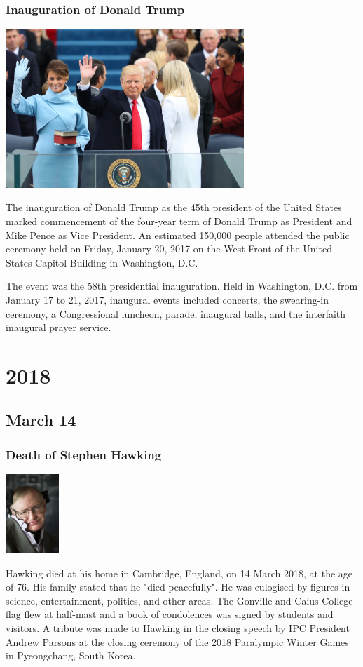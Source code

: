 \documentclass[11pt]{report}
\begin{document}
\subsection{Inauguration of Donald Trump}
\vspace{2mm}\begin{center}\includegraphics[width=9cm]{./img/trumpInaug.jpg}\end{center}
The inauguration of Donald Trump as the 45th president of the United States marked commencement of the four-year term of Donald Trump as President and Mike Pence as Vice President. An estimated 150,000 people attended the public ceremony held on Friday, January 20, 2017 on the West Front of the United States Capitol Building in Washington, D.C.

The event was the 58th presidential inauguration. Held in Washington, D.C. from January 17 to 21, 2017, inaugural events included concerts, the swearing-in ceremony, a Congressional luncheon, parade, inaugural balls, and the interfaith inaugural prayer service.

\chapter{2018}
\section{March 14}
\subsection{Death of Stephen Hawking}
\vspace{2mm}\begin{center}\includegraphics[width=2cm]{./img/stephenHawking.jpg}\end{center}
Hawking died at his home in Cambridge, England, on 14 March 2018, at the age of 76. His family stated that he "died peacefully". He was eulogised by figures in science, entertainment, politics, and other areas. The Gonville and Caius College flag flew at half-mast and a book of condolences was signed by students and visitors. A tribute was made to Hawking in the closing speech by IPC President Andrew Parsons at the closing ceremony of the 2018 Paralympic Winter Games in Pyeongchang, South Korea.\\
\end{document}
